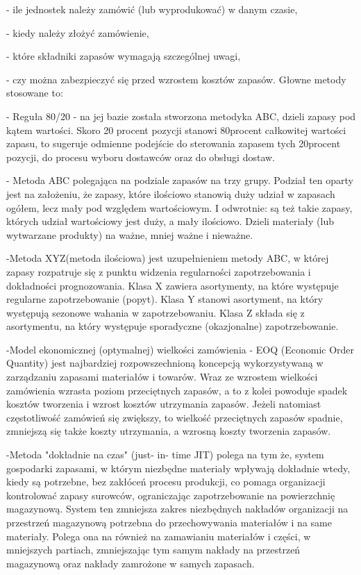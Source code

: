    - ile jednostek należy zamówić (lub wyprodukować) w danym czasie,
   
   - kiedy należy złożyć zamówienie,
   
  -  które składniki zapasów wymagają szczególnej uwagi,
  
 -   czy można zabezpieczyć się przed wzrostem kosztów zapasów.
 \vspace{\baselineskip} 
  Głowne metody stosowane to:
  
 - Reguła 80/20 - na jej bazie została stworzona metodyka ABC, dzieli zapasy pod kątem wartości. Skoro 20 procent pozycji stanowi 80procent całkowitej wartości zapasu, to sugeruje odmienne podejście do sterowania zapasem tych 20procent pozycji, do procesu wyboru dostawców oraz do obsługi dostaw.

 - Metoda ABC polegająca na podziale zapasów na trzy grupy. Podział ten oparty jest na założeniu, że zapasy, które ilościowo stanowią duży udział w zapasach ogółem, lecz mały pod względem wartościowym. I odwrotnie: są też takie zapasy, których udział wartościowy jest duży, a mały ilościowo. Dzieli materiały (lub wytwarzane produkty) na ważne, mniej ważne i nieważne. 
 
-Metoda XYZ(metoda ilościowa) jest uzupełnieniem metody ABC, w której zapasy rozpatruje się z punktu widzenia regularności zapotrzebowania i dokładności prognozowania. Klasa X zawiera asortymenty, na które występuje regularne zapotrzebowanie (popyt). Klasa Y stanowi asortyment, na który występują sezonowe wahania w zapotrzebowaniu. Klasa Z składa się z asortymentu, na który występuje sporadyczne (okazjonalne) zapotrzebowanie. 

-Model ekonomicznej (optymalnej) wielkości zamówienia - EOQ (Economic Order Quantity) jest najbardziej rozpowszechnioną koncepcją wykorzystywaną w zarządzaniu zapasami materiałów i towarów. Wraz ze wzrostem wielkości zamówienia wzrasta poziom przeciętnych zapasów, a to z kolei powoduje spadek kosztów tworzenia i wzrost kosztów utrzymania zapasów. Jeżeli natomiast częstotliwość zamówień się zwiększy, to wielkość przeciętnych zapasów spadnie, zmniejszą się także koszty utrzymania, a wzrosną koszty tworzenia zapasów. 

-Metoda "dokładnie na czas" (just- in- time JIT) polega na tym że, system gospodarki zapasami, w którym niezbędne materiały wpływają dokładnie wtedy, kiedy są potrzebne, bez zakłóceń procesu produkcji, co pomaga organizacji kontrolować zapasy surowców, ograniczając zapotrzebowanie na powierzchnię magazynową. System ten zmniejsza zakres niezbędnych nakładów organizacji na przestrzeń magazynową potrzebna do przechowywania materiałów i na same materiały. Polega ona na również na zamawianiu materiałów i części, w mniejszych partiach, zmniejszając tym samym nakłady na przestrzeń magazynową oraz nakłady zamrożone w samych zapasach. 


